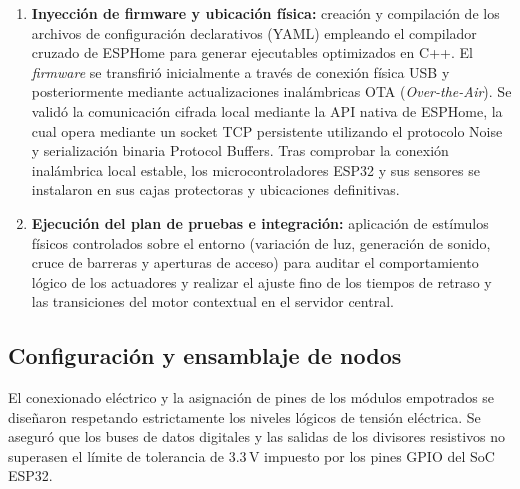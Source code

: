 \begin{enumerate}
    \item \textbf{Inyección de firmware y ubicación física:} creación y compilación de los archivos de configuración declarativos (YAML) empleando el compilador cruzado de ESPHome para generar ejecutables optimizados en C++. El \textit{firmware} se transfirió inicialmente a través de conexión física USB y posteriormente mediante actualizaciones inalámbricas OTA (\textit{Over-the-Air}). Se validó la comunicación cifrada local mediante la API nativa de ESPHome, la cual opera mediante un socket TCP persistente utilizando el protocolo Noise y serialización binaria Protocol Buffers. Tras comprobar la conexión inalámbrica local estable, los microcontroladores ESP32 y sus sensores se instalaron en sus cajas protectoras y ubicaciones definitivas.
    \item \textbf{Ejecución del plan de pruebas e integración:} aplicación de estímulos físicos controlados sobre el entorno (variación de luz, generación de sonido, cruce de barreras y aperturas de acceso) para auditar el comportamiento lógico de los actuadores y realizar el ajuste fino de los tiempos de retraso y las transiciones del motor contextual en el servidor central.
\end{enumerate}

\subsection{Configuración y ensamblaje de nodos}
\label{sec:conexionado}
El conexionado eléctrico y la asignación de pines de los módulos empotrados se diseñaron respetando estrictamente los niveles lógicos de tensión eléctrica. Se aseguró que los buses de datos digitales y las salidas de los divisores resistivos no superasen el límite de tolerancia de 3.3\,V impuesto por los pines GPIO del SoC ESP32.

